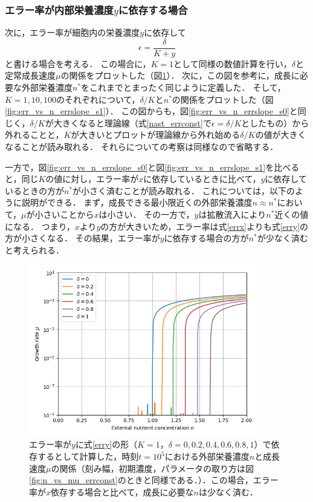 \subsubsection{エラー率が内部栄養濃度$y$に依存する場合}
次に，エラー率が細胞内の栄養濃度$y$に依存して
\begin{equation}
  \epsilon = \frac{\delta}{K + y} \label{erry}
\end{equation}
と書ける場合を考える．
この場合に，$K=1$として同様の数値計算を行い，$\delta$と定常成長速度$\mu$の関係をプロットした（図\ref{fig:n_vs_mu_K1s1}）．
次に，この図を参考に，成長に必要な外部栄養濃度$n^*$をこれまでとまったく同じように定義した．
そして，$K=1,10,100$のそれぞれについて，$\delta/K$と$n^*$の関係をプロットした（図\ref{fig:err_vs_n_errslope_s1}）．
この図からも，図\ref{fig:err_vs_n_errslope_s0}と同じく，$\delta/K$が大きくなると理論線（式\eqref{nast_errconst}で$\epsilon=\delta/K$としたもの）から外れることと，$K$が大きいとプロットが理論線から外れ始める$\delta/K$の値が大きくなることが読み取れる．
それらについての考察は同様なので省略する．

一方で，図\ref{fig:err_vs_n_errslope_s0}と図\ref{fig:err_vs_n_errslope_s1}を比べると，同じ$K$の値に対し，エラー率が$x$に依存しているときに比べて，$y$に依存しているときの方が$n^*$が小さく済むことが読み取れる．
これについては，以下のように説明ができる．
まず，成長できる最小限近くの外部栄養濃度$n\approx n^*$において，$\mu$が小さいことから$x$は小さい．
その一方で，$y$は拡散流入により$n^*$近くの値になる．
つまり，$x$より$y$の方が大きいため，エラー率は式\eqref{errx}よりも式\eqref{erry}の方が小さくなる．
その結果，エラー率が$y$に依存する場合の方が$n^*$が少なく済むと考えられる．

\begin{figure}[htbp]
  \centering
  \includegraphics[width=10cm]{n_vs_mu_K1s1_errslope.png}
  \caption{エラー率が$y$に式\eqref{erry}の形（$K=1$，$\delta=0,0.2,0.4,0.6,0.8,1$）で依存するとして計算した，時刻$t=10^5$における外部栄養濃度$n$と成長速度$\mu$の関係（刻み幅，初期濃度，パラメータの取り方は図\ref{fig:n_vs_mu_errconst}のときと同様である．）．この場合，エラー率が$x$依存する場合と比べて，成長に必要な$n$は少なく済む．}
  \label{fig:n_vs_mu_K1s1}
\end{figure}

